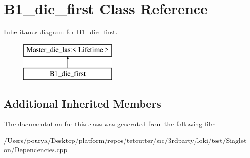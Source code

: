 \hypertarget{classB1__die__first}{}\section{B1\+\_\+die\+\_\+first Class Reference}
\label{classB1__die__first}
Inheritance diagram for B1\+\_\+die\+\_\+first\+:\begin{figure}[H]
\begin{center}
\leavevmode
\includegraphics[height=2.000000cm]{classB1__die__first}
\end{center}
\end{figure}
\subsection*{Additional Inherited Members}


The documentation for this class was generated from the following file\+:\begin{DoxyCompactItemize}
\item 
/\+Users/pourya/\+Desktop/platform/repos/tetcutter/src/3rdparty/loki/test/\+Singleton/Dependencies.\+cpp\end{DoxyCompactItemize}
